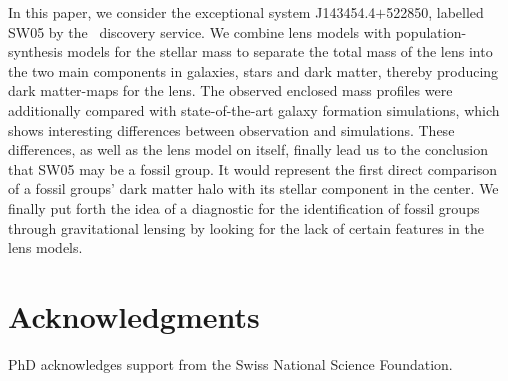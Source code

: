 \noindent In this paper, we consider the exceptional system J143454.4$+$522850,
labelled SW05 by the \SW~discovery service.  We combine lens models with
population-synthesis models for the stellar mass to separate the total mass of
the lens into the two main components in galaxies, stars and dark matter,
thereby producing dark matter-maps for the lens.  The observed enclosed mass
profiles were additionally compared with state-of-the-art galaxy formation
simulations, which shows interesting differences between observation and
simulations.  These differences, as well as the lens model on itself, finally
lead us to the conclusion that SW05 may be a fossil group.  It would represent
the first direct comparison of a fossil groups' dark matter halo with its
stellar component in the center.  We finally put forth the idea of a diagnostic
for the identification of fossil groups through gravitational lensing by looking
for the lack of certain features in the lens models.
%

\clearpage
  

  

  

  

  




% 
\section*{Acknowledgments}
PhD acknowledges support from the Swiss National Science Foundation.